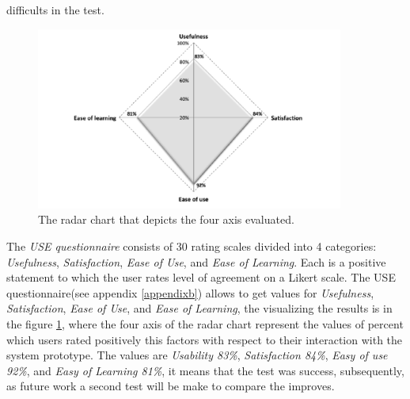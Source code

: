 difficults in the test.  
\begin{figure}
\centering
\small
\captionsetup{font=footnotesize}
\includegraphics[width=0.9\textwidth]{img/radial.png}
\caption{\small{The radar chart that depicts the four axis 
evaluated.}}
\label{fig:radial}   
\end{figure}
The \textit{USE questionnaire} consists of 30 rating scales divided
into 4 categories: \textit{Usefulness}, \textit{Satisfaction},
\textit{Ease of Use}, and \textit{Ease of Learning}. Each is a
positive statement to which the user rates level of agreement on a
Likert scale. The USE questionnaire(see appendix \ref{appendixb})
allows to get values for \textit{Usefulness}, \textit{Satisfaction},
\textit{Ease of Use}, and \textit{Ease of Learning}, the visualizing
the results is in the figure \ref{fig:radial}, where the four axis of the
radar chart represent the values of percent which users rated
positively this factors with respect to their interaction with the
system prototype.  The values are \textit{Usability 83\%},
\textit{Satisfaction 84\%}, \textit{Easy of use  92\%}, and
\textit{Easy of Learning 81\%}, it means that the test was success, 
subsequently, as future work  a second test will be make 
to compare the improves.



